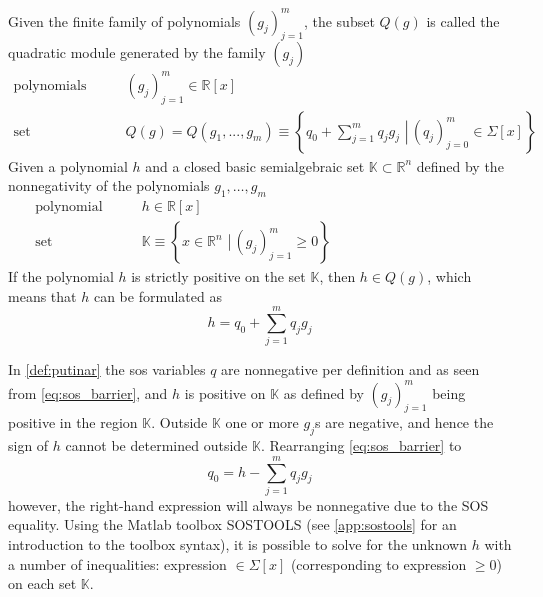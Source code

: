  

\begin{exa}\label{def:putinar}
Given the finite family of polynomials $(g_j)_{j=1}^m$, the subset $Q(g)$ is called the quadratic module generated by the family $(g_j)$ \citep[p 29]{bib:sos_putinar_lasserre}
\begin{subequations}\label{eq:putinar}
\begin{align}
\text{polynomials} \qquad & (g_j)_{j=1}^m \in\mathbb{R}[x]\\
\text{set} \qquad & Q(g)=Q(g_1,...,g_m)\equiv\left\{\left.q_0+\sum\limits_{j=1}^{m}q_jg_j\,\,\right| \, (q_j)_{j=0}^m\in\Sigma[x]\right\}
\end{align}
\end{subequations}
Given a polynomial $h$ and a closed basic semialgebraic set $\mathbb{K}\subset\mathbb{R}^n$ defined by the nonnegativity of the polynomials $g_1,\dots, g_m$  
\begin{subequations}
\begin{align}
\text{polynomial} \qquad & h \in\mathbb{R}[x]\\
\text{set} \qquad & \mathbb{K}\equiv\left\{\left.x\in \mathbb{R}^n\,\, \right| \, (g_j)_{j=1}^m\geq0\right\}\qquad\qquad\qquad\qquad\qquad\quad
\end{align}
\end{subequations}
If the polynomial $h$ is strictly positive on the set $\mathbb{K}$, then $h\in Q(g)$, which means that $h$  can be formulated as
\begin{equation}\label{eq:sos_barrier}
h = q_0+\sum\limits_{j=1}^{m}q_jg_j
\end{equation}
\end{exa}





In \autoref{def:putinar} the \gls{sos} variables $q$ are nonnegative per definition and as seen from \autoref{eq:sos_barrier}, and $h$ is positive on $\mathbb{K}$ as defined by $(g_j)_{j=1}^m$ being positive  in the region $\mathbb{K}$. Outside $\mathbb{K}$ one or more $g_j$s are negative, and hence the sign of $h$ cannot be determined outside $\mathbb{K}$.
Rearranging \autoref{eq:sos_barrier} to
\begin{equation}
q_0 = h - \sum _{j=1}^{m}q_jg_j \label{eq:putinar_sos}
\end{equation} 
however, the right-hand expression will always be nonnegative due to the SOS equality. Using the Matlab toolbox SOSTOOLS (see \autoref{app:sostools} for an introduction to the toolbox syntax), it is possible to solve for the unknown $h$ with a number of inequalities: expression $\in\Sigma[x]$ (corresponding to expression $\geq 0$) on each set $\mathbb{K}$. 

